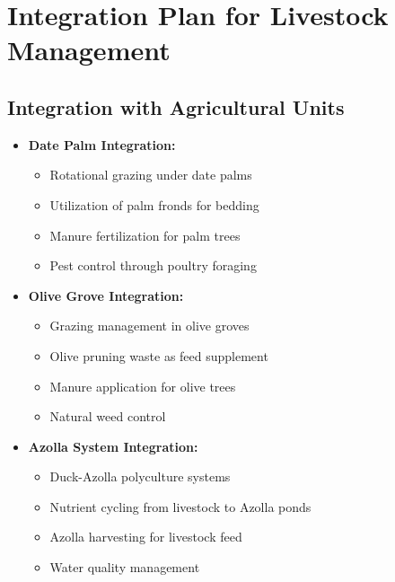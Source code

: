 \section{Integration Plan for Livestock Management}

\subsection{Integration with Agricultural Units}
\begin{itemize}
    \item \textbf{Date Palm Integration:}
    \begin{itemize}
        \item Rotational grazing under date palms
        \item Utilization of palm fronds for bedding
        \item Manure fertilization for palm trees
        \item Pest control through poultry foraging
    \end{itemize}
    
    \item \textbf{Olive Grove Integration:}
    \begin{itemize}
        \item Grazing management in olive groves
        \item Olive pruning waste as feed supplement
        \item Manure application for olive trees
        \item Natural weed control
    \end{itemize}
    
    \item \textbf{Azolla System Integration:}
    \begin{itemize}
        \item Duck-Azolla polyculture systems
        \item Nutrient cycling from livestock to Azolla ponds
        \item Azolla harvesting for livestock feed
        \item Water quality management
    \end{itemize}
\end{itemize}

